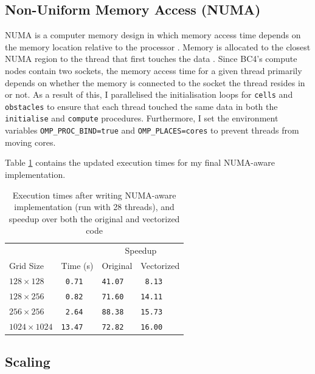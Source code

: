 \documentclass[twocolumn, a4paper]{article}
\begin{document}
\subsection{Non-Uniform Memory Access (NUMA)}

NUMA is a computer memory design in which memory access time depends on the memory location relative to the processor \cite{numa}.
Memory is allocated to the closest NUMA region to the thread that first touches the data \cite{numa_bristol}.
Since BC4's compute nodes contain two sockets, the memory access time for a given thread primarily depends on whether the memory is connected to the socket the thread resides in or not.
As a result of this, I parallelised the initialisation loops for \texttt{cells} and \texttt{obstacles} to ensure that each thread touched the same data in both the \texttt{initialise} and \texttt{compute} procedures.
Furthermore, I set the environment variables \texttt{OMP\_PROC\_BIND=true} and \texttt{OMP\_PLACES=cores} to prevent threads from moving cores.

Table \ref{tab:numa} contains the updated execution times for my final NUMA-aware implementation.

\begin{table}[htbp]
  \begin{center}
  \caption{Execution times after writing NUMA-aware implementation (run with 28 threads), and speedup over both the original and vectorized code}\label{tab:numa}
  \begin{tabular}{l | l  l  l} 
      \hline\hline
      &&\multicolumn{2}{c}{Speedup}\\
      \cline{3-4}
      Grid Size&Time (s)&Original&Vectorized\\
      \hline
      $128 \times 128$&\texttt{ 0.71}&\texttt{41.07}&\texttt{ 8.13}\\
      $128 \times 256$&\texttt{ 0.82}&\texttt{71.60}&\texttt{14.11}\\
      $256 \times 256$&\texttt{ 2.64}&\texttt{88.38}&\texttt{15.73}\\
      $1024 \times 1024$&\texttt{13.47}&\texttt{72.82}&\texttt{16.00}\\
      \hline
    \end{tabular}
  \end{center}
\end{table}

\subsection{Scaling}
\end{document}
